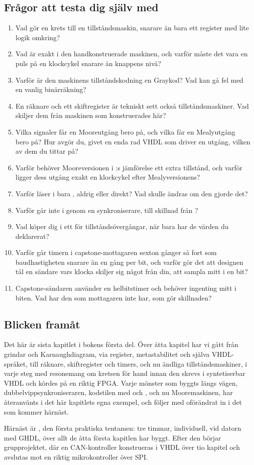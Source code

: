 \subsection*{Frågor att testa dig själv med}
\begin{enumerate}
  \item Vad gör en krets till en tillståndsmaskin, snarare än bara ett register med lite logik
    omkring?
  \item Vad är  exakt i den handkonstruerade maskinen, och varför måste det vara en puls på
    en klockcykel snarare än knappens nivå?
  \item Varför är den maskinens tillståndskodning en Graykod? Vad kan gå fel med en vanlig
    binärräkning?
  \item En räknare och ett skiftregister är tekniskt sett också tillståndsmaskiner. Vad skiljer dem
    från maskinen som konstruerades här?
  \item Vilka signaler får en Mooreutgång bero på, och vilka får en Mealyutgång bero på? Hur avgör
    du, givet en enda rad VHDL som driver en utgång, vilken av dem du tittar på?
  \item Varför behöver Mooreversionen i :s jämförelse ett extra tillstånd, och
    varför ligger dess utgång exakt en klockcykel efter Mealyversionens?
  \item Varför läser  i  bara , aldrig
     eller  direkt? Vad skulle ändras om den gjorde det?
  \item Varför går inte  i  genom en synkroniserare, till skillnad
    från ?
  \item Vad köper  dig i ett  för tillståndsövergångar, när
     bara har de värden du deklarerat?
  \item Varför går timern i capstone-mottagaren sexton gånger så fort som baudhastigheten snarare
    än en gång per bit, och varför gör det att designen tål en sändare vars klocka skiljer sig något
    från din, att sampla mitt i en bit?
  \item Capstone-sändaren använder en helbitstimer och behöver ingenting mitt i biten. Vad har den
    som mottagaren inte har, som gör skillnaden?
\end{enumerate}

\subsection*{Blicken framåt}
Det här är sista kapitlet i bokens första del. Över åtta kapitel har vi gått från grindar och
Karnaughdiagram, via register, metastabilitet och själva VHDL-språket, till räknare, skiftregister
och timers, och nu ändliga tillståndsmaskiner, i varje steg med resonemang om kretsen för hand innan
den skrevs i syntetiserbar VHDL och kördes på en riktig FPGA. Varje mönster som byggts längs vägen,
dubbelvippsynkroniseraren, kodstilen med  och , och nu Mooremaskinen, har
återanvänts i det här kapitlets egna exempel, och följer med oförändrat in i det som kommer härnäst.

Härnäst är , den första praktiska tentamen: tre timmar, individuell, vid datorn med
GHDL, över allt de åtta första kapitlen har byggt. Efter den börjar grupprojektet, där en
CAN-kontroller konstrueras i VHDL över tio kapitel och avslutas mot en riktig mikrokontroller över
SPI.
